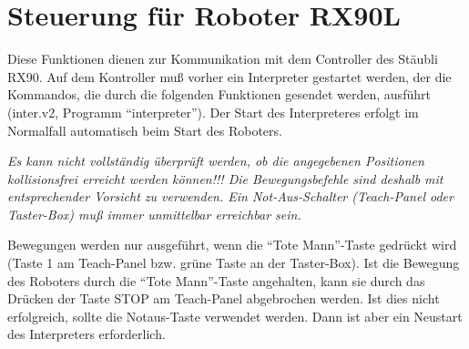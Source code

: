 \section{Steuerung für Roboter RX90L}
\label{Roboter}

Diese Funktionen dienen zur Kommunikation mit dem Controller des Stäubli
RX90. Auf dem Kontroller muß vorher ein Interpreter gestartet werden, der die
Kommandos, die durch die folgenden Funktionen gesendet werden, ausführt
(inter.v2, Programm ``interpreter''). Der Start des Interpreteres erfolgt
im Normalfall automatisch beim Start des Roboters.

{\em Es kann nicht vollständig überprüft werden, ob die angegebenen Positionen
kollisionsfrei erreicht werden können!!! Die Bewegungsbefehle sind deshalb mit
entsprechender Vorsicht zu verwenden. Ein Not-Aus-Schalter (Teach-Panel oder
Taster-Box) muß immer unmittelbar erreichbar sein.}

Bewegungen werden nur ausgeführt, wenn die ``Tote Mann''-Taste gedrückt
wird (Taste 1 am Teach-Panel bzw. grüne Taste an der Taster-Box). Ist 
die Bewegung des Roboters durch die ``Tote Mann''-Taste angehalten, kann 
sie durch das Drücken der Taste STOP am Teach-Panel abgebrochen werden. 
Ist dies nicht erfolgreich, sollte die Notaus-Taste verwendet werden. Dann
ist aber ein Neustart des Interpreters erforderlich.


